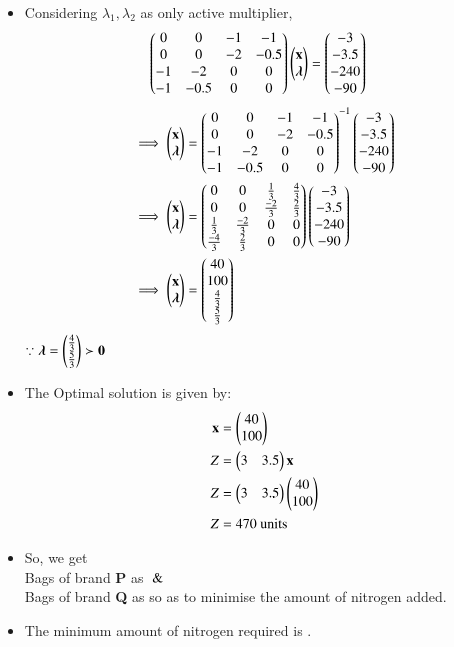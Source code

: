 \documentclass[journal,12pt,twocolumn]{IEEEtran}
\begin{document}
\begin{itemize}
\begin{align}
\end{align}
\item Considering $\lambda_1,\lambda_2$ as only active multiplier,
\begin{align}
    \begin{pmatrix}0 & 0 & -1 & -1  \\ 0 & 0 & -2 & -0.5 \\ -1 & -2 & 0 & 0 \\-1 & -0.5 & 0 & 0\end{pmatrix}\begin{pmatrix}\mathbf{x}\\ \boldsymbol{\lambda}\end{pmatrix} &= \begin{pmatrix}-3 \\ -3.5 \\ -240 \\ -90\end{pmatrix}
\end{align}
\begin{align}
 \implies   \begin{pmatrix}\mathbf{x} \\ \boldsymbol{\lambda}\end{pmatrix} &=  \begin{pmatrix}0 & 0 & -1 & -1  \\ 0 & 0 & -2 & -0.5 \\ -1 & -2 & 0 & 0 \\-1 & -0.5 & 0 & 0\end{pmatrix}^{-1}\begin{pmatrix}-3 \\ -3.5 \\ -240 \\ -90\end{pmatrix}
    \\
    \implies   \begin{pmatrix}\mathbf{x} \\ \boldsymbol{\lambda}\end{pmatrix} &= \begin{pmatrix}0 & 0 & \frac{1}{3} & \frac{4}{3} \\ 0 & 0 & \frac{-2}{3} & \frac{2}{3} \\ \frac{1}{3} & \frac{-2}{3} & 0 & 0 \\ \frac{-4}{3} & \frac{2}{3} & 0 & 0\end{pmatrix}\begin{pmatrix}-3 \\ -3.5 \\ -240 \\ -90\end{pmatrix}
    \\
    \implies \begin{pmatrix}\mathbf{x} \\ \boldsymbol{\lambda}\end{pmatrix} &= \begin{pmatrix}40 \\100 \\ \frac{4}{3} \\ \frac{5}{3} \end{pmatrix}
\end{align}
$\because \boldsymbol{\lambda}=\begin{pmatrix}\frac{4}{3} \\ \frac{5}{3}\end{pmatrix} \succ \mathbf{0}$
\\
\item The Optimal solution is given by:
\begin{align}
    \mathbf{x} &= \begin{pmatrix}40\\100\end{pmatrix} \\
    Z &= \begin{pmatrix}3&3.5\end{pmatrix}\mathbf{x} \\
   Z &= \begin{pmatrix}3&3.5\end{pmatrix}\begin{pmatrix}40 \\ 100\end{pmatrix} \\
    Z&= 470 \text{ units}
\end{align}
\item So, we get
\\
 Bags of brand \textbf{P} as  $\And$
 \\
 Bags of brand \textbf{Q} as   so as to minimise the amount of nitrogen added.
\item The minimum amount of nitrogen required is  .


\end{itemize}
\end{document}
